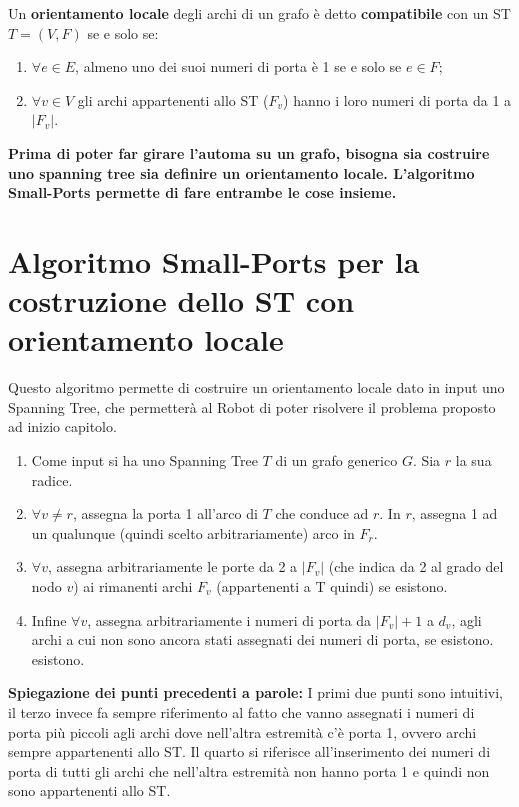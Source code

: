 \begin{definition}
    Un \textbf{orientamento locale} degli archi di un grafo è detto
    \textbf{compatibile} con un ST $T=(V,F)$ se e solo se:
    \begin{enumerate}
        \item $\forall e \in E$, almeno uno dei suoi numeri di porta è 1 se e solo
              se $e \in F$;
        \item $\forall v \in V$ gli archi appartenenti allo ST ($F_v$) hanno i loro
              numeri di porta da 1 a $|F_v|$.
    \end{enumerate}
\end{definition}

\textbf{Prima di poter far girare l'automa su un grafo,
    bisogna sia costruire uno spanning tree sia definire un orientamento locale.
    L'algoritmo Small-Ports permette di fare entrambe le cose insieme.}

\section{Algoritmo Small-Ports per la costruzione dello ST con orientamento locale}
Questo algoritmo permette di costruire un orientamento locale dato in input uno
Spanning Tree, che permetterà al Robot di poter risolvere il problema proposto
ad inizio capitolo.
\begin{enumerate}
    \item Come input si ha uno Spanning Tree $T$ di un grafo generico $G$. Sia $r$
          la sua radice.

    \item $\forall v \neq r$, assegna la porta 1 all'arco di $T$ che conduce ad
          $r$. In $r$, assegna 1 ad un qualunque (quindi scelto arbitrariamente) arco in
          $F_r$.
    \item $\forall v$, assegna arbitrariamente le porte da 2 a $|F_v|$ (che indica
          da 2 al grado del nodo $v$) ai rimanenti archi $F_v$ (appartenenti a T quindi)
          se esistono.
    \item Infine $\forall v$, assegna arbitrariamente i numeri di porta da
          $|F_v|+1$ a $d_v$, agli archi a cui non sono ancora stati assegnati dei numeri
          di porta, se esistono.%
          esistono.
\end{enumerate}
\textbf{Spiegazione dei punti precedenti a parole:} I primi due punti sono
intuitivi, il terzo invece fa sempre riferimento al fatto che vanno assegnati i
numeri di porta più piccoli agli archi dove nell'altra estremità c'è porta 1,
ovvero archi sempre appartenenti allo ST. Il quarto si riferisce all'inserimento
dei numeri di porta di tutti gli archi che nell'altra estremità non hanno porta
1 e quindi non sono appartenenti allo ST.

